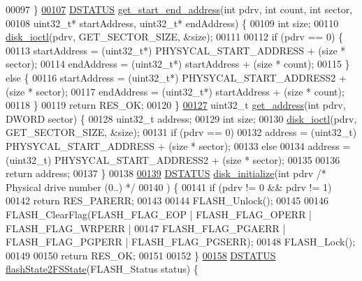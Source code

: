 \begin{DoxyCode}
00097 \}
\hypertarget{diskio_8c_source_l00107}{}\hyperlink{diskio_8c_adbcc8690662c4993d61adc9e13d7cffc}{00107} \hyperlink{diskio_8h_adba6790898ce4029c20a34b898ce73c1}{DSTATUS} \hyperlink{diskio_8c_adbcc8690662c4993d61adc9e13d7cffc}{get\_start\_end\_address}(\textcolor{keywordtype}{int} pdrv, \textcolor{keywordtype}{int} count, \textcolor{keywordtype}{int} sector,
00108     uint32\_t* startAddress, uint32\_t* endAddress) \{
00109   \textcolor{keywordtype}{int} size;
00110   \hyperlink{diskio_8c_a816bffc54e390c15d03f477133707de5}{disk\_ioctl}(pdrv, GET\_SECTOR\_SIZE, &size);
00111 
00112   \textcolor{keywordflow}{if} (pdrv == 0) \{
00113     startAddress = (uint32\_t*) PHYSYCAL\_START\_ADDRESS + (size * sector);
00114     endAddress = (uint32\_t*) startAddress + (size * count);
00115   \} \textcolor{keywordflow}{else} \{
00116     startAddress = (uint32\_t*) PHYSYCAL\_START\_ADDRESS2 + (size * sector);
00117     endAddress = (uint32\_t*) startAddress + (size * count);
00118   \}
00119   \textcolor{keywordflow}{return} RES\_OK;
00120 \}
\hypertarget{diskio_8c_source_l00127}{}\hyperlink{diskio_8c_a713082e3e5375e658a941a3cca667aed}{00127} uint32\_t \hyperlink{diskio_8c_a713082e3e5375e658a941a3cca667aed}{get\_address}(\textcolor{keywordtype}{int} pdrv, DWORD sector) \{
00128   uint32\_t address;
00129   \textcolor{keywordtype}{int} size;
00130   \hyperlink{diskio_8c_a816bffc54e390c15d03f477133707de5}{disk\_ioctl}(pdrv, GET\_SECTOR\_SIZE, &size);
00131   \textcolor{keywordflow}{if} (pdrv == 0)
00132     address = (uint32\_t) PHYSYCAL\_START\_ADDRESS + (size * sector);
00133   \textcolor{keywordflow}{else}
00134     address = (uint32\_t) PHYSYCAL\_START\_ADDRESS2 + (size * sector);
00135 
00136   \textcolor{keywordflow}{return} address;
00137 \}
00138 
\hypertarget{diskio_8c_source_l00139}{}\hyperlink{diskio_8h_aa01f5479a3ee7c9aed89814238964cd2}{00139} \hyperlink{diskio_8h_adba6790898ce4029c20a34b898ce73c1}{DSTATUS} \hyperlink{diskio_8c_aa01f5479a3ee7c9aed89814238964cd2}{disk\_initialize}(\textcolor{keywordtype}{int} pdrv \textcolor{comment}{/* Physical drive number (0..) */}
00140 ) \{
00141   \textcolor{keywordflow}{if} (pdrv != 0 && pdrv != 1)
00142     \textcolor{keywordflow}{return} RES\_PARERR;
00143 
00144   FLASH\_Unlock();
00145 
00146   FLASH\_ClearFlag(FLASH\_FLAG\_EOP | FLASH\_FLAG\_OPERR | FLASH\_FLAG\_WRPERR |
00147   FLASH\_FLAG\_PGAERR | FLASH\_FLAG\_PGPERR | FLASH\_FLAG\_PGSERR);
00148   FLASH\_Lock();
00149 
00150   \textcolor{keywordflow}{return} RES\_OK;
00151 
00152 \}
\hypertarget{diskio_8c_source_l00158}{}\hyperlink{diskio_8c_a3dfe0827b5e2a3a79da131b076adedff}{00158} \hyperlink{diskio_8h_adba6790898ce4029c20a34b898ce73c1}{DSTATUS} \hyperlink{diskio_8c_a3dfe0827b5e2a3a79da131b076adedff}{flashState2FSState}(FLASH\_Status status) \{

\end{DoxyCode}
